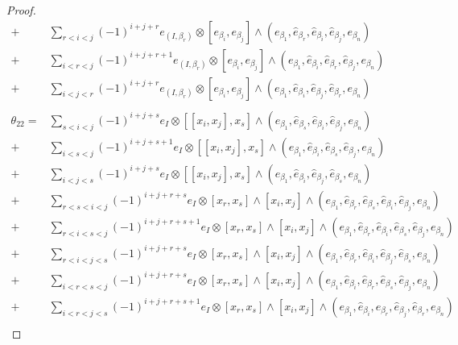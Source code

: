 \begin{proof}
\begin{align*}
  +& \sum_{r < i < j} (-1)^{i + j + r}e_{(I, \beta_r)} \otimes [e_{\beta_i}, e_{\beta_j}] \wedge(e_{\beta_1}, \widehat{e}_{\beta_r}, \widehat{e}_{\beta_i}, \widehat{e}_{\beta_j}, e_{\beta_n}) \\
  +& \sum_{i < r < j} (-1)^{i + j + r + 1}e_{(I, \beta_r)} \otimes [e_{\beta_i}, e_{\beta_j}] \wedge(e_{\beta_1}, \widehat{e}_{\beta_i}, \widehat{e}_{\beta_r}, \widehat{e}_{\beta_j}, e_{\beta_n}) \\
  +&\sum_{i < j < r} (-1)^{i + j + r}e_{(I, \beta_r)} \otimes [e_{\beta_i}, e_{\beta_j}] \wedge(e_{\beta_1}, \widehat{e}_{\beta_i}, \widehat{e}_{\beta_j}, \widehat{e}_{\beta_r}, e_{\beta_n}) \\
  \\
  \theta_{22} = &\sum_{s < i < j}(-1)^{i + j + s} e_{I} \otimes \left[[x_i, x_j], x_s \right] \wedge(e_{\beta_1}, \widehat{e}_{\beta_s}, \widehat{e}_{\beta_i}, \widehat{e}_{\beta_j}, e_{\beta_n}) \\
  +&\sum_{i < s < j}(-1)^{i + j + s + 1} e_{I} \otimes \left[[x_i, x_j], x_s \right] \wedge(e_{\beta_1}, \widehat{e}_{\beta_i}, \widehat{e}_{\beta_s}, \widehat{e}_{\beta_j}, e_{\beta_n}) \\
  +&\sum_{i < j < s}(-1)^{i + j + s} e_{I} \otimes \left[[x_i, x_j], x_s \right] \wedge(e_{\beta_1}, \widehat{e}_{\beta_i}, \widehat{e}_{\beta_j}, \widehat{e}_{\beta_s}, e_{\beta_n}) \\
  +&\sum_{r < s <i < j }(-1)^{i + j + r + s} e_{I} \otimes [x_r, x_s] \wedge [x_i, x_j]  \wedge(e_{\beta_1}, \widehat{e}_{\beta_r}, \widehat{e}_{\beta_s}, \widehat{e}_{\beta_i}, \widehat{e}_{\beta_j}, e_{\beta_n}) \\
  +&\sum_{r < i < s < j }(-1)^{i + j + r + s + 1} e_{I} \otimes [x_r, x_s] \wedge [x_i, x_j]  \wedge(e_{\beta_1}, \widehat{e}_{\beta_r}, \widehat{e}_{\beta_i}, \widehat{e}_{\beta_s}, \widehat{e}_{\beta_j}, e_{\beta_n}) \\
  +&\sum_{r < i <j < s }(-1)^{i + j + r + s} e_{I} \otimes [x_r, x_s] \wedge [x_i, x_j]  \wedge(e_{\beta_1}, \widehat{e}_{\beta_r}, \widehat{e}_{\beta_i}, \widehat{e}_{\beta_j}, \widehat{e}_{\beta_s}, e_{\beta_n}) \\
  +&\sum_{i < r <s < j }(-1)^{i + j + r + s} e_{I} \otimes [x_r, x_s] \wedge [x_i, x_j]  \wedge(e_{\beta_1}, \widehat{e}_{\beta_i}, \widehat{e}_{\beta_r}, \widehat{e}_{\beta_s}, \widehat{e}_{\beta_j}, e_{\beta_n}) \\
  +&\sum_{i < r <j < s }(-1)^{i + j + r + s + 1} e_{I} \otimes [x_r, x_s] \wedge [x_i, x_j]  \wedge(e_{\beta_1}, \widehat{e}_{\beta_i}, \widehat{e}_{\beta_r}, \widehat{e}_{\beta_j}, \widehat{e}_{\beta_r}, e_{\beta_n}) \\

\end{align*}
\end{proof}
